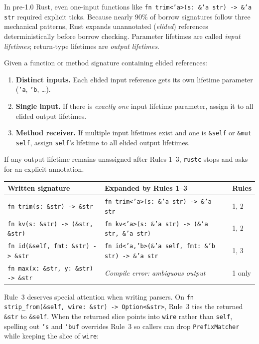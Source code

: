 In pre-1.0 Rust, even one-input functions like \texttt{fn trim<'a>(s:\ \&'a str) -> \&'a str} required explicit ticks. Because nearly 90\% of borrow signatures follow three mechanical patterns, Rust expands unannotated (\emph{elided}) references deterministically before borrow checking. Parameter lifetimes are called \emph{input lifetimes}; return-type lifetimes are \emph{output lifetimes}.

\begin{definition}
\label{ch04:def-elision}
Given a function or method signature containing elided references:
\begin{enumerate}
  \item \textbf{Distinct inputs.} Each elided input reference gets its own lifetime parameter (\texttt{'a}, \texttt{'b}, \dots).
  \item \textbf{Single input.} If there is \emph{exactly one} input lifetime parameter, assign it to all elided output lifetimes.
  \item \textbf{Method receiver.} If multiple input lifetimes exist and one is \texttt{\&self} or \texttt{\&mut self}, assign \texttt{self}'s lifetime to all elided output lifetimes.
\end{enumerate}
If any output lifetime remains unassigned after Rules 1--3, \texttt{rustc} stops and asks for an explicit annotation.
\end{definition}

\begin{center}
\small
\begin{tabular}{@{}lll@{}}
\toprule
\textbf{Written signature} & \textbf{Expanded by Rules 1--3} & \textbf{Rules} \\
\midrule
\texttt{fn trim(s:\ \&str) -> \&str} & \texttt{fn trim<'a>(s:\ \&'a str) -> \&'a str} & 1, 2 \\
\texttt{fn kv(s:\ \&str) -> (\&str, \&str)} & \texttt{fn kv<'a>(s:\ \&'a str) -> (\&'a str, \&'a str)} & 1, 2 \\
\texttt{fn id(\&self, fmt:\ \&str) -> \&str} & \texttt{fn id<'a,'b>(\&'a self, fmt:\ \&'b str) -> \&'a str} & 1, 3 \\
\texttt{fn max(x:\ \&str, y:\ \&str) -> \&str} & \emph{Compile error: ambiguous output} & 1 only \\
\bottomrule
\end{tabular}
\end{center}

Rule~3 deserves special attention when writing parsers. On \texttt{fn strip\_from(\&self, wire:\ \&str) -> Option<\&str>}, Rule~3 ties the returned \texttt{\&str} to \texttt{\&self}. When the returned slice points into \texttt{wire} rather than \texttt{self}, spelling out \texttt{'s} and \texttt{'buf} overrides Rule~3 so callers can drop \texttt{PrefixMatcher} while keeping the slice of \texttt{wire}:

